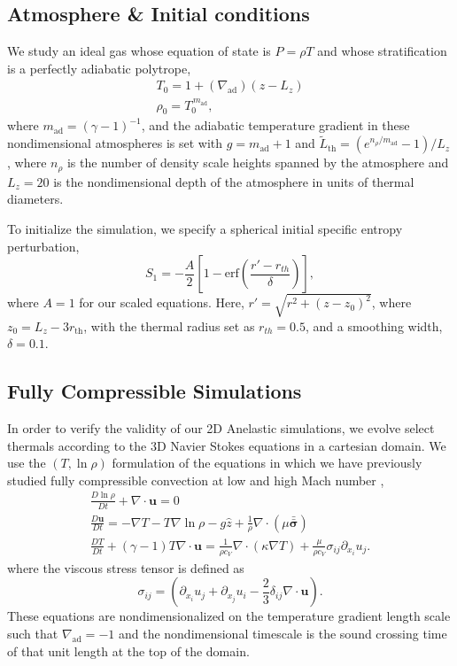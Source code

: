 \documentclass[twocolumn, amsmath, amsfonts, amssymb, trackchanges]{aastex62}
\newcommand{\DivU}{\ensuremath{\nabla\cdot\bm{u}}}
\newcommand{\grad}{\ensuremath{\nabla}}
\newcommand{\lilstressT}{\ensuremath{\bm{\bar{\bar{\sigma}}}}}
\begin{document}
\subsection{Atmosphere \& Initial conditions}
We study an ideal gas whose equation of state is $P = \rho T$ and whose stratification is a perfectly adiabatic polytrope,
\begin{gather}
T_0 = 1 + (\grad_{\text{ad}})(z - L_z) \\
\rho_0 = T_0^{\,m_{\text{ad}}},
\label{eqn:polytrope}
\end{gather}
where $m_{\text{ad}} = (\gamma-1)^{-1}$, and the adiabatic temperature gradient in these nondimensional atmospheres is set with $g = m_{\text{ad}} + 1$ and $\tilde{L}_{\text{th}} = (e^{n_\rho/m_{\text{ad}}} - 1)/L_z$, where $n_\rho$ is the number of density scale heights spanned by the atmosphere and $L_z = 20$ is the nondimensional depth of the atmosphere in units of thermal diameters.
 
To initialize the simulation, we specify a spherical initial specific entropy perturbation,
\begin{equation}
S_1 = - \frac{A}{2}\left[1 - \text{erf}\left(\frac{r' - r_{th}}{\delta}\right)\right],
\label{eqn:thermal_IC}
\end{equation}
where $A = 1$ for our scaled equations.
Here, $r' = \sqrt{r^2 + (z - z_0)^2}$, where $z_0 = L_z - 3r_{\text{th}}$, with the thermal radius set as $r_{th} = 0.5$, and a smoothing width, $\delta = 0.1$.

\subsection{Fully Compressible Simulations}
In order to verify the validity of our 2D Anelastic simulations, we evolve select thermals according to the 3D Navier Stokes equations in a cartesian domain. 
We use the $(T, \ln\rho)$ formulation of the equations in which we have previously studied fully compressible convection at low and high Mach number \citep{lecoanet&all2014, anders&brown2017},
\begin{gather}
\frac{D \ln\rho}{Dt} + \DivU = 0 \\
\frac{D \bm{u}}{D t} = -\grad T - T\grad\ln\rho - g\hat{z} + \frac{1}{\rho}\grad\cdot\left(\mu\lilstressT\right) \\
\frac{D T}{Dt} + (\gamma-1)T\DivU  = \frac{1}{\rho c_V}\grad\cdot\left(\kappa \grad T\right) + \frac{\mu}{\rho c_V}\sigma_{ij}\partial_{x_i}u_j.
\end{gather}
where the viscous stress tensor is defined as
\begin{equation}
\sigma_{ij} = \left(\partial_{x_i}u_j + \partial_{x_j}u_i - \frac{2}{3}\delta_{ij}\grad\cdot\bm{u}\right).
\end{equation}
These equations are nondimensionalized on the temperature gradient length scale such that $\grad_{\text{ad}} = -1$ and the nondimensional timescale is the sound crossing time of that unit length at the top of the domain.  
\end{document}

